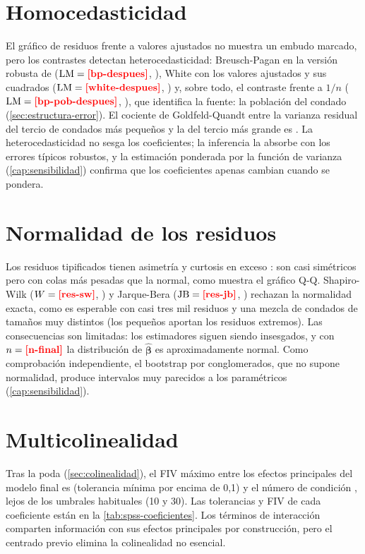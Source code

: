 \section{Homocedasticidad}

El gráfico de residuos frente a valores ajustados no muestra un embudo marcado, pero los
contrastes detectan heterocedasticidad: Breusch-Pagan en la versión robusta de
\textcite{koenker1981} ($\mathrm{LM}=\res{bp-despues}$, ), White con los valores
ajustados y sus cuadrados ($\mathrm{LM}=\res{white-despues}$, ) y, sobre
todo, el contraste frente a $1/n$ ($\mathrm{LM}=\res{bp-pob-despues}$, ),
que identifica la fuente: la población del condado (\cref{sec:estructura-error}). El cociente de
Goldfeld-Quandt entre la varianza residual del tercio de condados más pequeños y la del tercio más
grande es . La heterocedasticidad no sesga los coeficientes; la inferencia la
absorbe con los errores típicos robustos, y la estimación ponderada por la función de varianza
(\cref{cap:sensibilidad}) confirma que los coeficientes apenas cambian cuando se pondera.

\section{Normalidad de los residuos}

Los residuos tipificados tienen asimetría  y curtosis en exceso
: son casi simétricos pero con colas más pesadas que la normal, como muestra el
gráfico Q-Q. Shapiro-Wilk ($W=\res{res-sw}$, ) y Jarque-Bera
($\mathrm{JB}=\res{res-jb}$, ) rechazan la normalidad exacta, como es esperable con
casi tres mil residuos y una mezcla de condados de tamaños muy distintos (los pequeños aportan los
residuos extremos). Las consecuencias son limitadas: los estimadores siguen siendo insesgados, y
con $n=\res{n-final}$ la distribución de $\hat{\boldsymbol\beta}$ es aproximadamente normal. Como
comprobación independiente, el bootstrap por conglomerados, que no supone normalidad, produce
intervalos muy parecidos a los paramétricos (\cref{cap:sensibilidad}).

\section{Multicolinealidad}

Tras la poda (\cref{sec:colinealidad}), el FIV máximo entre los efectos principales del modelo
final es  (tolerancia mínima por encima de 0,1) y el número de condición
, lejos de los umbrales habituales (10 y 30). Las tolerancias y FIV de cada
coeficiente están en la \cref{tab:spss-coeficientes}. Los términos de interacción comparten
información con sus efectos principales por construcción, pero el centrado previo elimina la
colinealidad no esencial.

